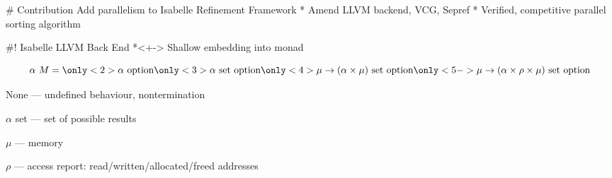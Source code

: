 \documentclass[fleqn]{beamer}
\begin{document}
# Contribution
  Add parallelism to Isabelle Refinement Framework
  * Amend LLVM backend, VCG, Sepref
  * Verified, competitive parallel sorting algorithm





#! Isabelle LLVM Back End
  *<+-> Shallow embedding into monad 

  \[\alpha~M =
    \only<2>{\alpha\textrm{ option}}
    \only<3>{\alpha \textrm{ set option}}
    \only<4>{\mu \to (\alpha\times\mu) \textrm{ set option} }
    \only<5->{\mu \to (\alpha\times\rho\times\mu) \textrm{ set option} }
  \]

   None --- undefined behaviour, nontermination

   $\alpha$ set --- set of possible results

   $\mu$ --- memory

   $\rho$ --- access report: read/written/allocated/freed addresses


  \hfill
\end{document}
